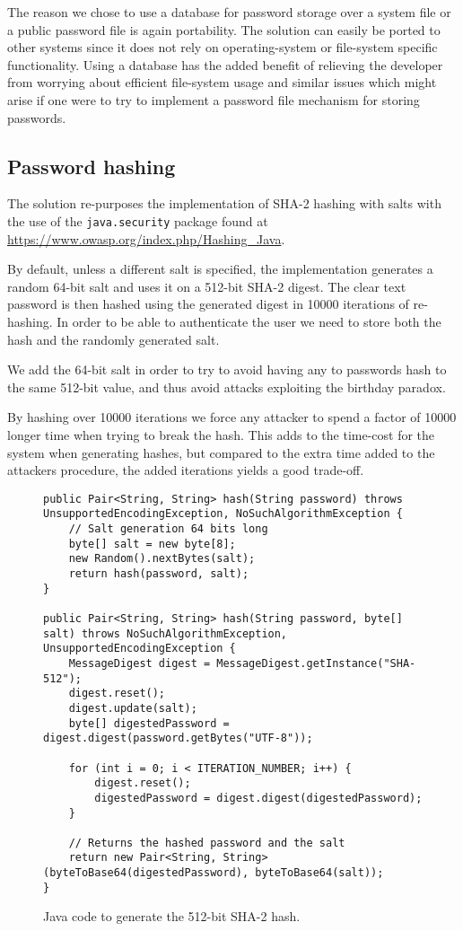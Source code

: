 \documentclass[12pt]{article}
\begin{document}
The reason we chose to use a database for password storage over a system file or a public password file is again portability. The solution can easily be ported to other systems since it does not rely on operating-system or file-system specific functionality. Using a database has the added benefit of relieving the developer from worrying about efficient file-system usage and similar issues which might arise if one were to try to implement a password file mechanism for storing passwords.

\subsection{Password hashing}
\label{sub:Password hashing}

The solution re-purposes the implementation of SHA-2 hashing with salts with the use of the \texttt{java.security} package found at \url{https://www.owasp.org/index.php/Hashing_Java}.

By default, unless a different salt is specified, the implementation generates a random 64-bit salt and uses it on a 512-bit SHA-2 digest. The clear text password is then hashed using the generated digest in 10000 iterations of re-hashing.
In order to be able to authenticate the user we need to store both the hash and the randomly generated salt.

We add the 64-bit salt in order to try to avoid having any to passwords hash to the same 512-bit value, and thus avoid attacks exploiting the birthday paradox.

By hashing over 10000 iterations we force any attacker to spend a factor of 10000 longer time when trying to break the hash. This adds to the time-cost for the system when generating hashes, but compared to the extra time added to the attackers procedure, the added iterations yields a good trade-off.

\begin{figure}[h!]
    \begin{lstlisting}
public Pair<String, String> hash(String password) throws UnsupportedEncodingException, NoSuchAlgorithmException {
    // Salt generation 64 bits long
    byte[] salt = new byte[8];
    new Random().nextBytes(salt);
    return hash(password, salt);
}

public Pair<String, String> hash(String password, byte[] salt) throws NoSuchAlgorithmException, UnsupportedEncodingException {
    MessageDigest digest = MessageDigest.getInstance("SHA-512");
    digest.reset();
    digest.update(salt);
    byte[] digestedPassword = digest.digest(password.getBytes("UTF-8"));

    for (int i = 0; i < ITERATION_NUMBER; i++) {
        digest.reset();
        digestedPassword = digest.digest(digestedPassword);
    }

    // Returns the hashed password and the salt
    return new Pair<String, String>(byteToBase64(digestedPassword), byteToBase64(salt));
}
    \end{lstlisting}
    \caption{Java code to generate the 512-bit SHA-2 hash.}
\end{figure}
\end{document}
